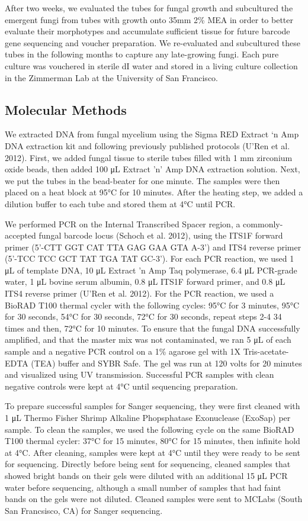 \documentclass[fleqn,10pt,lineno]{wlpeerj} %
\begin{document}
After two weeks, we evaluated the tubes for fungal growth and
subcultured the emergent fungi from tubes with growth onto 35mm 2\% MEA
in order to better evaluate their morphotypes and accumulate sufficient
tissue for future barcode gene sequencing and voucher preparation. We
re-evaluated and subcultured these tubes in the following months to
capture any late-growing fungi. Each pure culture was vouchered in
sterile dI water and stored in a living culture collection in the
Zimmerman Lab at the University of San Francisco.

\hypertarget{molecular-methods}{%
\subsection{Molecular Methods}\label{molecular-methods}}

We extracted DNA from fungal mycelium using the Sigma RED Extract `n Amp
DNA extraction kit and following previously published protocols (U'Ren
et al. 2012). First, we added fungal tissue to sterile tubes filled with
1 mm zirconium oxide beads, then added 100 μL Extract 'n' Amp DNA
extraction solution. Next, we put the tubes in the bead-beater for one
minute. The samples were then placed on a heat block at 95°C for 10
minutes. After the heating step, we added a dilution buffer to each tube
and stored them at 4°C until PCR.

We performed PCR on the Internal Transcribed Spacer region, a
commonly-accepted fungal barcode locus (Schoch et al. 2012), using the
ITS1F forward primer (5'-CTT GGT CAT TTA GAG GAA GTA A-3') and ITS4
reverse primer (5'-TCC TCC GCT TAT TGA TAT GC-3'). For each PCR
reaction, we used 1 μL of template DNA, 10 μL Extract 'n Amp Taq
polymerase, 6.4 μL PCR-grade water, 1 μL bovine serum albumin, 0.8 μL
ITS1F forward primer, and 0.8 μL ITS4 reverse primer (U'Ren et al.
2012). For the PCR reaction, we used a BioRAD T100 thermal cycler with
the following cycles: 95°C for 3 minutes, 95°C for 30 seconds, 54°C for
30 seconds, 72°C for 30 seconds, repeat steps 2-4 34 times and then,
72°C for 10 minutes. To ensure that the fungal DNA successfully
amplified, and that the master mix was not contaminated, we ran 5 μL of
each sample and a negative PCR control on a 1\% agarose gel with 1X
Tris-acetate-EDTA (TEA) buffer and SYBR Safe. The gel was run at 120
volts for 20 minutes and visualized using UV transmission. Successful
PCR samples with clean negative controls were kept at 4°C until
sequencing preparation.

To prepare successful samples for Sanger sequencing, they were first
cleaned with 1 μL Thermo Fisher Shrimp Alkaline Phopsphatase Exonuclease
(ExoSap) per sample. To clean the samples, we used the following cycle
on the same BioRAD T100 thermal cycler: 37°C for 15 minutes, 80°C for 15
minutes, then infinite hold at 4°C. After cleaning, samples were kept at
4°C until they were ready to be sent for sequencing. Directly before
being sent for sequencing, cleaned samples that showed bright bands on
their gels were diluted with an additional 15 μL PCR water before
sequencing, although a small number of samples that had faint bands on
the gels were not diluted. Cleaned samples were sent to MCLabs (South
San Francsisco, CA) for Sanger sequencing.
\end{document}

